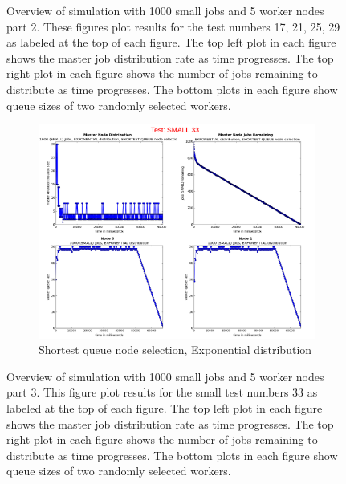 \documentclass{article}
\begin{document}
\begin{figure}[p]
  
  \caption{Overview of simulation with 1000 small jobs and 5 worker nodes part 2. These figures plot results for the test numbers 17, 21, 25, 29 as labeled at the top of each figure. The top left plot in each figure shows the master job distribution rate as time progresses. The top right plot in each figure shows the number of jobs remaining to distribute as time progresses. The bottom plots in each figure show queue sizes of two randomly selected workers.}
  \label{testsSmall17-29} 
  
\end{figure}

\begin{figure} 
\hspace*{9em}
\begin{subfigure}[b]{0.5\linewidth}
    \centering
    \includegraphics[scale=0.20]{combined_small_overview/case_small_33} 
    \caption{Shortest queue node selection, Exponential distribution} 
    \label{testSmall33} 
  \end{subfigure}

  \caption{Overview of simulation with 1000 small jobs and 5 worker nodes part 3. This figure plot results for the small test numbers 33 as labeled at the top of each figure. The top left plot in each figure shows the master job distribution rate as time progresses. The top right plot in each figure shows the number of jobs remaining to distribute as time progresses. The bottom plots in each figure show queue sizes of two randomly selected workers.}
  \label{testSmall33Figure} 
\end{figure}
\end{document}

